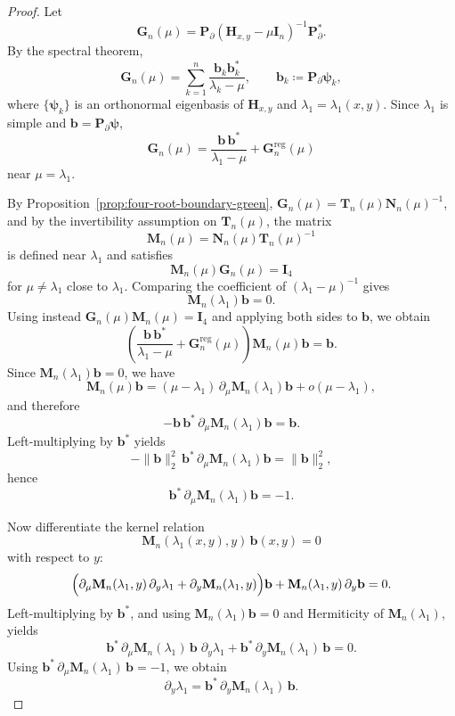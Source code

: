 \documentclass[11pt]{article}
\begin{document}
\begin{proof}
Let
\[
\mathbf G_n(\mu)=\mathbf P_\partial(\mathbf H_{x,y}-\mu\mathbf I_n)^{-1}\mathbf P_\partial^*.
\]
By the spectral theorem,
\[
\mathbf G_n(\mu)
=
\sum_{k=1}^n
\frac{\mathbf b_k\mathbf b_k^*}{\lambda_k-\mu},
\qquad
\mathbf b_k\coloneqq \mathbf P_\partial \boldsymbol{\psi}_k,
\]
where \(\{\boldsymbol{\psi}_k\}\) is an orthonormal eigenbasis of \(\mathbf H_{x,y}\) and \(\lambda_1=\lambda_1(x,y)\). Since \(\lambda_1\) is simple and \(\mathbf b=\mathbf P_\partial \boldsymbol{\psi}\),
\[
\mathbf G_n(\mu)
=
\frac{\mathbf b\,\mathbf b^*}{\lambda_1-\mu}
+
\mathbf G_n^{\mathrm{reg}}(\mu)
\]
near \(\mu=\lambda_1\).

By Proposition~\ref{prop:four-root-boundary-green}, \(\mathbf G_n(\mu)=\mathbf T_n(\mu)\mathbf N_n(\mu)^{-1}\), and by the invertibility assumption on \(\mathbf T_n(\mu)\), the matrix
\[
\mathbf M_n(\mu)=\mathbf N_n(\mu)\mathbf T_n(\mu)^{-1}
\]
is defined near \(\lambda_1\) and satisfies
\[
\mathbf M_n(\mu)\mathbf G_n(\mu)=\mathbf I_4
\]
for \(\mu\neq \lambda_1\) close to \(\lambda_1\). Comparing the coefficient of \((\lambda_1-\mu)^{-1}\) gives
\[
\mathbf M_n(\lambda_1)\mathbf b=0.
\]
Using instead \(\mathbf G_n(\mu)\mathbf M_n(\mu)=\mathbf I_4\) and applying both sides to \(\mathbf b\), we obtain
\[
\left(\frac{\mathbf b\,\mathbf b^*}{\lambda_1-\mu}+\mathbf G_n^{\mathrm{reg}}(\mu)\right)\mathbf M_n(\mu)\mathbf b=\mathbf b.
\]
Since \(\mathbf M_n(\lambda_1)\mathbf b=0\), we have
\[
\mathbf M_n(\mu)\mathbf b
=
(\mu-\lambda_1)\,\partial_\mu \mathbf M_n(\lambda_1)\mathbf b+o(\mu-\lambda_1),
\]
and therefore
\[
-\mathbf b\,\mathbf b^*\,\partial_\mu \mathbf M_n(\lambda_1)\mathbf b=\mathbf b.
\]
Left-multiplying by \(\mathbf b^*\) yields
\[
-\|\mathbf b\|_2^2\,\mathbf b^*\,\partial_\mu \mathbf M_n(\lambda_1)\mathbf b
=
\|\mathbf b\|_2^2,
\]
hence
\[
\mathbf b^*\,\partial_\mu \mathbf M_n(\lambda_1)\mathbf b=-1.
\]

Now differentiate the kernel relation
\[
\mathbf M_n(\lambda_1(x,y),y)\,\mathbf b(x,y)=0
\]
with respect to \(y\):
\[
\Bigl(\partial_\mu \mathbf M_n(\lambda_1,y)\,\partial_y\lambda_1
+\partial_y\mathbf M_n(\lambda_1,y)\Bigr)\mathbf b
+
\mathbf M_n(\lambda_1,y)\,\partial_y\mathbf b
=0.
\]
Left-multiplying by \(\mathbf b^*\), and using \(\mathbf M_n(\lambda_1)\mathbf b=0\) and Hermiticity of \(\mathbf M_n(\lambda_1)\), yields
\[
\mathbf b^*\,\partial_\mu \mathbf M_n(\lambda_1)\,\mathbf b\;\partial_y\lambda_1
+
\mathbf b^*\,\partial_y\mathbf M_n(\lambda_1)\,\mathbf b
=0.
\]
Using \(\mathbf b^*\,\partial_\mu \mathbf M_n(\lambda_1)\,\mathbf b=-1\), we obtain
\[
\partial_y\lambda_1
=
\mathbf b^*\,\partial_y\mathbf M_n(\lambda_1)\,\mathbf b.
\]
\end{proof}
\end{document}
